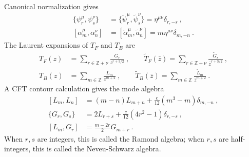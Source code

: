 	Canonical normalization gives
	\begin{subequations}
		\begin{align}
			\{\psi_{r}^{\mu},\psi_{s}^{\nu}\}&=\{\tilde{\psi}_{r}^{\mu},\tilde{\psi}_{s}^{\nu}\}=\eta^{\mu\nu}\delta_{r,-s}\:,
			\label{10.2.9a} \\
			[\alpha_{m}^{\mu},\alpha_{n}^{\nu}]&=[\tilde{\alpha}_{m}^{\mu},\tilde{a}_{n}^{\nu}]=m\eta^{\mu\nu}\delta_{m,-n}\:.
			\label{10.2.9.b}
		\end{align}
	\end{subequations}
	The Laurent expansions of $T_{F}$ and $T_{B}$ are
	\begin{subequations}
		\begin{align}
			T_{F}(z)&=\sum_{r\in \mathds{Z}+\nu}\frac{G_{r}}{z^{r+3/2}}\:,  \qquad
			\tilde{T}_{F}(\bar{z})=\sum_{r\in \mathds{Z}+\nu}\frac{\tilde{G}_{r}}{\bar{z}^{r+3/2}}\:, \label{10.2.10a}\\
			T_{B}(z)&=\sum_{m\in \mathds{Z}}\frac{L_{m}}{z^{m+2}}\:, \qquad
			\tilde{T}_{B}(\bar{z})=\sum_{m\in \mathds{Z}}\frac{\tilde{L}_{m}}{\bar{z}^{m+2}} \:. \label{10.2.10b}
		\end{align} \label{10.2.10}
	\end{subequations}
	A CFT contour calculation gives the mode algebra
	\begin{subequations}
		\begin{align}
			[L_{m},L_{n}] &=(m-n)L_{m+n}+\frac{c}{12}(m^{3}-m)\delta_{m,-n} \:, \label{10.2.11a} \\
			\{G_{r},G_{s}\} &=2L_{r+s}+\frac{c}{12}(4r^{2}-1)\delta_{r,-s} \:, \label{10.2.11b} \\
			[L_{m},G_{r}] &= \frac{m-2r}{2}G_{m+r} \:. \label{10.2.11c}
		\end{align}
	\end{subequations}
	When $r,s$ are integers, this is called the Ramond algebra; when $r,s$ are half-integers, this is called the Neveu-Schwarz algebra.
